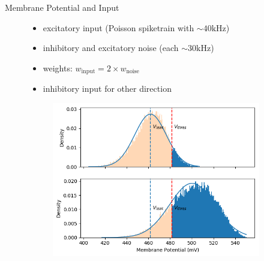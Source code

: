 \documentclass[12pt, aspectratio=169]{beamer}
\begin{document}
\begin{frame}{Membrane Potential and Input}
    \begin{figure}[!htb]
            \begin{itemize}
                \item excitatory input (Poisson spiketrain with $\sim 40 \text{kHz}$)
                \item inhibitory and excitatory noise (each $\sim 30 \text{kHz}$)
                \item weights: $w_{\text{input}} = 2 \times w_{\text{noise}}$
                \item inhibitory input for other direction
            \end{itemize}
      	\endminipage\hfill
      	    \centering
      	    \vspace{20pt}
            \begin{figure}
            
                \includegraphics[scale=0.5]{mfp/activation_function_vmem_distr_with_input_with_thres.png}
                \label{membrane_potential}
            \end{figure}
        \endminipage\hfill
    \end{figure}
\end{frame}
\end{document}
